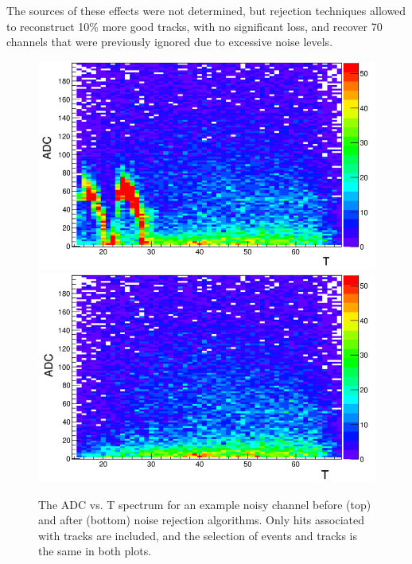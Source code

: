 \documentclass[preprint,5p]{elsarticle}
\begin{document}
The sources of these effects were not determined, but rejection techniques 
allowed to reconstruct 10\% more good tracks, with no significant loss, and 
recover 70 channels that were previously ignored due to excessive noise levels.

\begin{figure}[tb!]\centering
\includegraphics[scale=0.25]{fig/noisy_pad_before_rejection2.png}
\includegraphics[scale=0.25]{fig/noisy_pad_after_rejection2.png}
\caption{The ADC vs. T spectrum for an example noisy channel before (top) and 
after (bottom) noise rejection algorithms.  Only hits associated with tracks 
are included, and the selection of events and tracks is the same in both 
plots.}
\label{fig:noise}
\end{figure}
\end{document}
